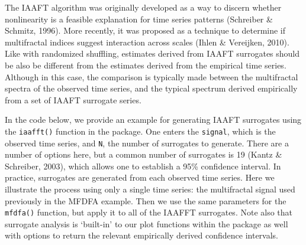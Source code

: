\documentclass[
  man]{apa6}
\newenvironment{Shaded}{\begin{snugshade}}{\end{snugshade}}
\newcommand{\AttributeTok}[1]{\textcolor[rgb]{0.13,0.29,0.53}{#1}}
\newcommand{\DecValTok}[1]{\textcolor[rgb]{0.00,0.00,0.81}{#1}}
\newcommand{\FunctionTok}[1]{\textcolor[rgb]{0.13,0.29,0.53}{\textbf{#1}}}
\newcommand{\NormalTok}[1]{#1}
\newcommand{\OtherTok}[1]{\textcolor[rgb]{0.56,0.35,0.01}{#1}}
\newcommand{\SpecialCharTok}[1]{\textcolor[rgb]{0.81,0.36,0.00}{\textbf{#1}}}
\begin{document}
The IAAFT algorithm was originally developed as a way to discern whether
nonlinearity is a feasible explanation for time series patterns
(Schreiber \& Schmitz, 1996). More recently, it was proposed as a technique to
determine if multifractal indices suggest interaction across scales
(Ihlen \& Vereijken, 2010). Like with randomized shuffling, estimates derived from
IAAFT surrogates should be also be different from the estimates derived
from the empirical time series. Although in this case, the comparison is
typically made between the multifractal spectra of the observed time
series, and the typical spectrum derived empirically from a set of IAAFT
surrogate series.

In the code below, we provide an example for generating IAAFT surrogates
using the \texttt{iaafft()} function in the package. One enters the \texttt{signal},
which is the observed time series, and \texttt{N}, the number of surrogates to
generate. There are a number of options here, but a common number of
surrogates is 19 (Kantz \& Schreiber, 2003), which allows one to establish a 95\%
confidence interval. In practice, surrogates are generated from each
observed time series. Here we illustrate the process using only a single
time series: the multifractal signal used previously in the MFDFA
example. Then we use the same parameters for the \texttt{mfdfa()} function, but
apply it to all of the IAAFFT surrogates. Note also that surrogate
analysis is `built-in' to our plot functions within the package as well
with options to return the relevant empirically derived confidence
intervals.

\begin{Shaded}
\end{Shaded}
\end{document}
